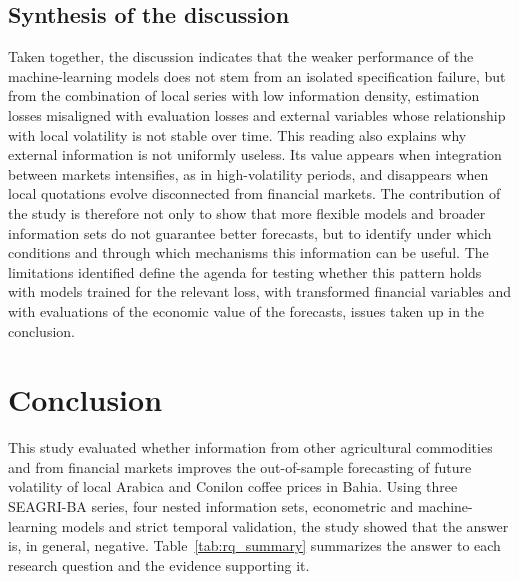 \documentclass[a4paper,fleqn]{cas-sc}
\begin{document}
\subsection{Synthesis of the discussion}

Taken together, the discussion indicates that the weaker performance of the machine-learning models does not stem from an isolated specification failure, but from the combination of local series with low information density, estimation losses misaligned with evaluation losses and external variables whose relationship with local volatility is not stable over time. This reading also explains why external information is not uniformly useless. Its value appears when integration between markets intensifies, as in high-volatility periods, and disappears when local quotations evolve disconnected from financial markets. The contribution of the study is therefore not only to show that more flexible models and broader information sets do not guarantee better forecasts, but to identify under which conditions and through which mechanisms this information can be useful. The limitations identified define the agenda for testing whether this pattern holds with models trained for the relevant loss, with transformed financial variables and with evaluations of the economic value of the forecasts, issues taken up in the conclusion.

\section{Conclusion}
\label{sec:conclusion}

This study evaluated whether information from other agricultural commodities and from financial markets improves the out-of-sample forecasting of future volatility of local Arabica and Conilon coffee prices in Bahia. Using three SEAGRI-BA series, four nested information sets, econometric and machine-learning models and strict temporal validation, the study showed that the answer is, in general, negative. Table~\ref{tab:rq_summary} summarizes the answer to each research question and the evidence supporting it.
\end{document}
